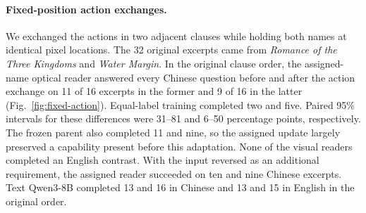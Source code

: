 \paragraph{Fixed-position action exchanges.}
We exchanged the actions in two adjacent clauses while holding both names at identical pixel locations. The 32 original excerpts came from \textit{Romance of the Three Kingdoms} and \textit{Water Margin}. In the original clause order, the assigned-name optical reader answered every Chinese question before and after the action exchange on 11 of 16 excerpts in the former and 9 of 16 in the latter (Fig.~\ref{fig:fixed-action}). Equal-label training completed two and five. Paired 95\% intervals for these differences were 31--81 and 6--50 percentage points, respectively. The frozen parent also completed 11 and nine, so the assigned update largely preserved a capability present before this adaptation. None of the visual readers completed an English contrast. With the input reversed as an additional requirement, the assigned reader succeeded on ten and nine Chinese excerpts. Text Qwen3-8B completed 13 and 16 in Chinese and 13 and 15 in English in the original order.

